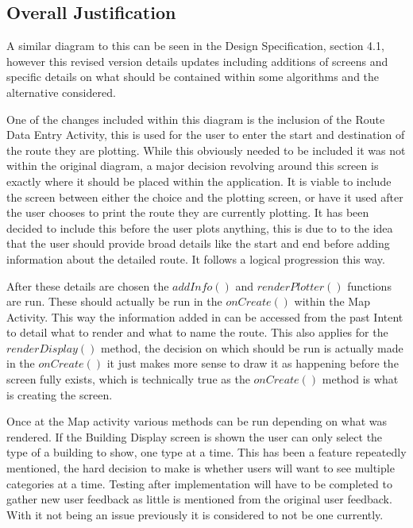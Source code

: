\subsection{Overall Justification}
A similar diagram to this can be seen in the Design Specification, section 4.1, however this revised version details updates including additions of screens and specific details on what should be contained within some algorithms and the alternative considered. 

One of the changes included within this diagram is the inclusion of the Route Data Entry Activity, this is used for the user to enter the start and destination of the route they are plotting. While this obviously needed to be included it was not within the original diagram, a major decision revolving around this screen is exactly where it should be placed within the application. It is viable to include the screen between either the choice and the plotting screen, or have it used after the user chooses to print the route they are currently plotting. It has been decided to include this before the user plots anything, this is due to to the idea that the user should provide broad details like the start and end before adding information about the detailed route. It follows a logical progression this way. 

After these details are chosen the $addInfo()$ and  $renderPlotter()$ functions are run. These should actually be run in the $onCreate()$ within the Map Activity. This way the information added in can be accessed from the past Intent to detail what to render and what to name the route. This also applies for the $renderDisplay()$ method, the decision on which should be run is actually made in the $onCreate()$ it just makes more sense to draw it as happening before the screen fully exists, which is technically true as the $onCreate()$ method is what is creating the screen. 

Once at the Map activity various methods can be run depending on what was rendered. If the Building Display screen is shown the user can only select the type of a building to show, one type at a time. This has been a feature repeatedly mentioned, the hard decision to make is whether users will want to see multiple categories at a time. Testing after implementation will have to be completed to gather new user feedback as little is mentioned from the original user feedback. With it not being an issue previously it is considered to not be one currently.

